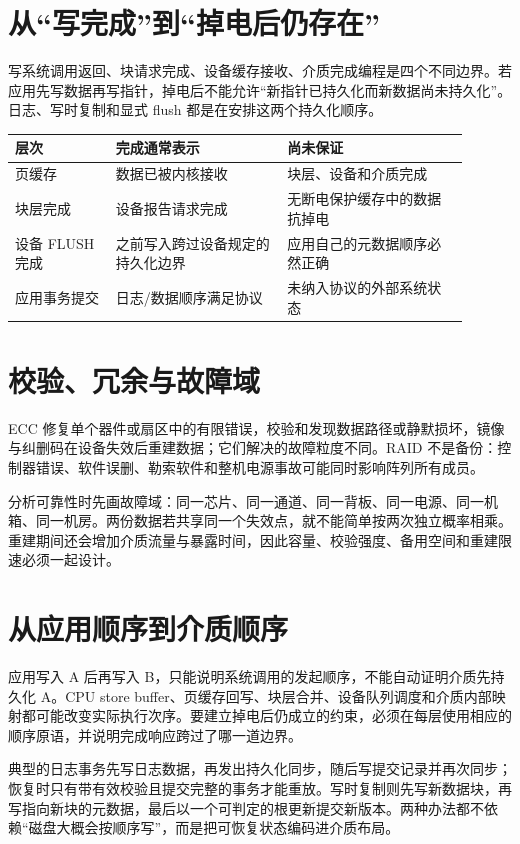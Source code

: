 \section{从“写完成”到“掉电后仍存在”}

写系统调用返回、块请求完成、设备缓存接收、介质完成编程是四个不同边界。若应用先写数据再写指针，掉电后不能允许“新指针已持久化而新数据尚未持久化”。日志、写时复制和显式 flush 都是在安排这两个持久化顺序。

\begin{longtable}{L{0.2\linewidth}L{0.34\linewidth}L{0.36\linewidth}}
\toprule
层次 & 完成通常表示 & 尚未保证 \\
\midrule
页缓存 & 数据已被内核接收 & 块层、设备和介质完成 \\
块层完成 & 设备报告请求完成 & 无断电保护缓存中的数据抗掉电 \\
设备 FLUSH 完成 & 之前写入跨过设备规定的持久化边界 & 应用自己的元数据顺序必然正确 \\
应用事务提交 & 日志/数据顺序满足协议 & 未纳入协议的外部系统状态 \\
\bottomrule
\end{longtable}

\section{校验、冗余与故障域}

ECC 修复单个器件或扇区中的有限错误，校验和发现数据路径或静默损坏，镜像与纠删码在设备失效后重建数据；它们解决的故障粒度不同。RAID 不是备份：控制器错误、软件误删、勒索软件和整机电源事故可能同时影响阵列所有成员。

分析可靠性时先画故障域：同一芯片、同一通道、同一背板、同一电源、同一机箱、同一机房。两份数据若共享同一个失效点，就不能简单按两次独立概率相乘。重建期间还会增加介质流量与暴露时间，因此容量、校验强度、备用空间和重建限速必须一起设计。

\section{从应用顺序到介质顺序}

应用写入 A 后再写入 B，只能说明系统调用的发起顺序，不能自动证明介质先持久化 A。CPU store buffer、页缓存回写、块层合并、设备队列调度和介质内部映射都可能改变实际执行次序。要建立掉电后仍成立的约束，必须在每层使用相应的顺序原语，并说明完成响应跨过了哪一道边界。

典型的日志事务先写日志数据，再发出持久化同步，随后写提交记录并再次同步；恢复时只有带有效校验且提交完整的事务才能重放。写时复制则先写新数据块，再写指向新块的元数据，最后以一个可判定的根更新提交新版本。两种办法都不依赖“磁盘大概会按顺序写”，而是把可恢复状态编码进介质布局。

